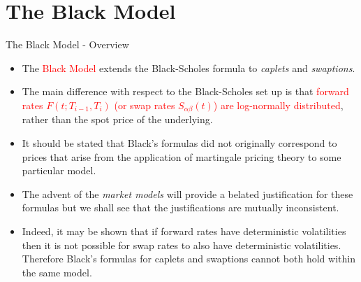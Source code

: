 \documentclass{beamer}
\begin{document}
\section{The Black Model}
\begin{frame}{The Black Model - Overview}
	\begin{itemize}
		\item The \textcolor{red}{Black Model} extends the Black-Scholes formula to \emph{caplets} and \emph{swaptions}. %
		\item The main difference with respect to the Black-Scholes set up is that \textcolor{red}{forward rates $F(t;T_{i-1},T_i)$ (or swap rates $S_{\alpha\beta}(t)$) are log-normally distributed}, rather than the spot price of the underlying. 
		\item It should be stated that Black’s formulas did not originally correspond to prices that arise from the application of martingale pricing theory to some particular model. 
		\item The advent of the \emph{market models} will provide a belated justification for these formulas but we shall see that the justifications are mutually inconsistent. 
		\item Indeed, it may be shown that if forward rates have deterministic volatilities then it is not possible for swap rates to also have deterministic volatilities. Therefore Black’s formulas for caplets and swaptions cannot both hold within the same model. 
	\end{itemize}
\end{frame}

\end{document}
